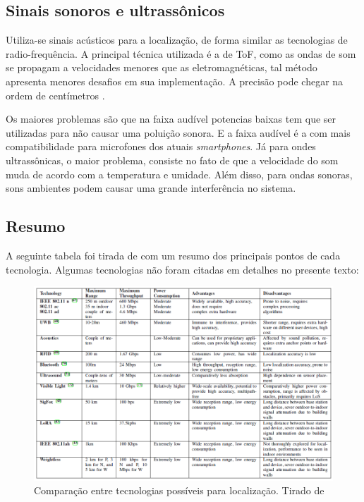 \subsection{Sinais sonoros e ultrassônicos}

Utiliza-se sinais acústicos para a localização, de forma similar as tecnologias de radio-frequência.
A principal técnica utilizada é a de ToF, como as ondas de som se propagam a velocidades menores que as eletromagnéticas, tal método apresenta menores desafios em sua implementação. A precisão pode chegar na ordem de centímetros \cite{art11}.

Os maiores problemas são que na faixa audível potencias baixas tem que ser utilizadas para não causar uma poluição sonora. E a faixa audível é a com mais compatibilidade para microfones dos atuais \textit{smartphones}. Já para ondes ultrassônicas, o maior problema, consiste no fato de que a velocidade do som muda de acordo com a temperatura e umidade. Além disso, para ondas sonoras, sons ambientes podem causar uma grande interferência no sistema.


\subsection{Resumo}
A seguinte tabela foi tirada de \cite{art2} com um resumo dos principais pontos de cada tecnologia. Algumas tecnologias não foram citadas em detalhes no presente texto:

\begin{figure}[H]
	\centering 
	\includegraphics[scale = 0.7]{images/technologies_table.png}
	\caption{Comparação entre tecnologias possíveis para localização. Tirado de \cite{art2}}
	\label{fig:technologies_table}
\end{figure}
